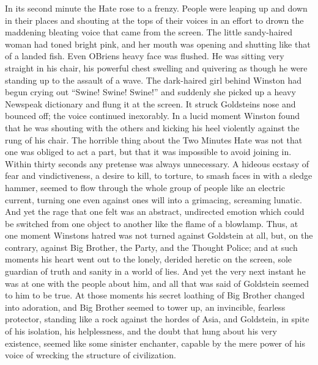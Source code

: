 \begin{paracol}{2}
\switchcolumn*

In its second minute the Hate rose to a frenzy. People were leaping up
and down in their places and shouting at the tops of their voices in an
effort to drown the maddening bleating voice that came from the screen.
The little sandy-haired woman had toned bright pink, and her mouth was
opening and shutting like that of a landed fish. Even
O\textquotesingle Brien\textquotesingle s heavy face was flushed. He was
sitting very straight in his chair, his powerful chest swelling and
quivering as though he were standing up to the assault of a wave. The
dark-haired girl behind Winston had begun crying out ``Swine! Swine!
Swine!'' and suddenly she picked up a heavy Newspeak dictionary and flung
it at the screen. It struck Goldstein\textquotesingle s nose and bounced
off; the voice continued inexorably. In a lucid moment Winston found
that he was shouting with the others and kicking his heel violently
against the rung of his chair. The horrible thing about the Two Minutes
Hate was not that one was obliged to act a part, but that it was
impossible to avoid joining in. Within thirty seconds any pretense was
always unnecessary. A hideous ecstasy of fear and vindictiveness, a
desire to kill, to torture, to smash faces in with a sledge hammer,
seemed to flow through the whole group of people like an electric
current, turning one even against one\textquotesingle s will into a
grimacing, screaming lunatic. And yet the rage that one felt was an
abstract, undirected emotion which could be switched from one object to
another like the flame of a blowlamp. Thus, at one moment
Winston\textquotesingle s hatred was not turned against Goldstein at
all, but, on the contrary, against Big Brother, the Party, and the
Thought Police; and at such moments his heart went out to the lonely,
derided heretic on the screen, sole guardian of truth and sanity in a
world of lies. And yet the very next instant he was at one with the
people about him, and all that was said of Goldstein seemed to him to be
true. At those moments his secret loathing of Big Brother changed into
adoration, and Big Brother seemed to tower up, an invincible, fearless
protector, standing like a rock against the hordes of Asia, and
Goldstein, in spite of his isolation, his helplessness, and the doubt
that hung about his very existence, seemed like some sinister enchanter,
capable by the mere power of his voice of wrecking the structure of
civilization.

\switchcolumn


\end{paracol}
